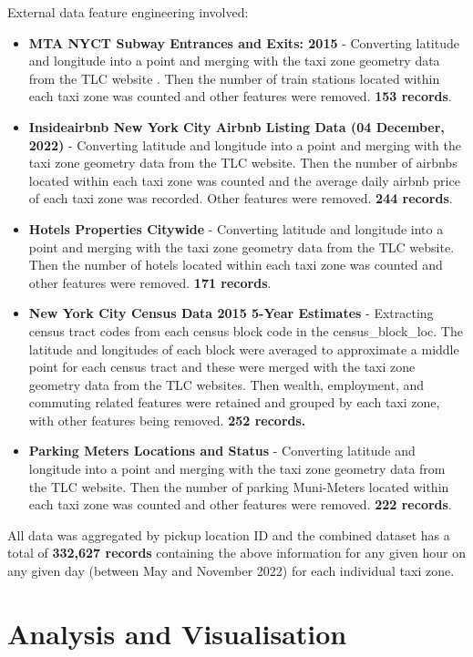 \documentclass[11pt]{article}
\begin{document}
External data feature engineering involved: 
\begin{itemize} 
    \item \textbf{MTA NYCT Subway Entrances and Exits: 2015} - Converting latitude and longitude into a point and merging with the taxi zone geometry data from the TLC website \cite{taxidata}. Then the number of train stations located within each taxi zone was counted and other features were removed. \textbf{153 records}.
    \item \textbf{Insideairbnb New York City Airbnb Listing Data (04 December, 2022)} - Converting latitude and longitude into a point and merging with the taxi zone geometry data from the TLC website. Then the number of airbnbs located within each taxi zone was counted and the average daily airbnb price of each taxi zone was recorded. Other features were removed. \textbf{244 records}.
    \item \textbf{Hotels Properties Citywide} - Converting latitude and longitude into a point and merging with the taxi zone geometry data from the TLC website. Then the number of hotels located within each taxi zone was counted and other features were removed. \textbf{171 records}.
    \item \textbf{New York City Census Data 2015 5-Year Estimates} -  Extracting census tract codes from each census block code in the census\_block\_loc. The latitude and longitudes of each block were averaged to approximate a middle point for each census tract and these were merged with the taxi zone geometry data from the TLC websites. Then wealth, employment, and commuting related features were retained and grouped by each taxi zone, with other features being removed. \textbf{252 records.} 
    \item \textbf{Parking Meters Locations and Status} - Converting latitude and longitude into a point and merging with the taxi zone geometry data from the TLC website. Then the number of parking Muni-Meters located within each taxi zone was counted and other features were removed. \textbf{222 records}.
\end{itemize} 

All data was aggregated by pickup location ID and the combined dataset has a total of \textbf{332,627 records} containing the above information for any given hour on any given day (between May and November 2022) for each individual taxi zone.

\section{Analysis and Visualisation}
\end{document}
